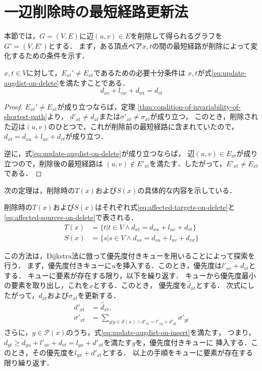\section{一辺削除時の最短経路更新法}
\label{sect:update-apsp-on-delete}
本節では，$G=(V,E)$に辺$(u,v)\in E$を削除して得られるグラフを$G'=(V,E')$とする．
まず，ある頂点ペア$x,t$の間の最短経路が削除によって変化するための条件を示す．

\begin{lemma}
  \label{lmm:update-augdist-on-delete}
  $x,t\in V$に対して，$E_{xt}'\neq E_{xt}$であるための必要十分条件は
  $x,t$が式\eqref{eq:update-augdist-on-delete}を満たすことである．
  \begin{equation}
    d_{xv}+l_{vw}+d_{wt}=d_{vt}
    \label{eq:update-augdist-on-delete}
  \end{equation}
\end{lemma}
\begin{proof}
  $E_{xt}'\neq E_{xt}$が成り立つならば，定理
  \ref{thm:condition-of-invariability-of-shortest-path}より，
  $d'_{xt}\neq d_{xt}$または$\sigma'_{xt}\neq\sigma_{xt}$が成り立つ，
  このとき，削除された辺は$(u,v)$のひとつで，これが削除前の最短経路に含まれていたので，
  $d_{xt}=d_{xu}+l_{uv}+d_{vt}$が成り立つ．

  逆に，式\eqref{eq:update-augdist-on-delete}が成り立つならば，
  辺$(u,v)\in E_{xt}$が成り立つので，削除後の最短経路は
  $(u,v)\notin E'_{xt}$を満たす．したがって，$E'_{xt}\neq E_{xt}$である．
\end{proof}

次の定理は，削除時の$T(x)$および$S(x)$の具体的な内容を示している．
\begin{theorem}
  \label{thm:affected-vertices-on-delete}
  削除時の$T(x)$および$S(x)$はそれぞれ式\eqref{eq:affected-targets-on-delete}と
  \eqref{eq:affected-sources-on-delete}で表される．
  \begin{align}
    T(x)&=\{t|t\in V\land d_{xt}=d_{xu}+l_{uv}+d_{vt}\}
    \label{eq:affected-targets-on-delete} \\
    S(x)&=\{s|s\in V\land d_{sx}=d_{su}+l_{uv}+d_{vx}\}
    \label{eq:affected-sources-on-delete}
  \end{align}
\end{theorem}

この方法は，Dijkstra法に倣って優先度付きキューを用いることによって探索を行う．
まず，優先度付きキューに$u$を挿入する．このとき，優先度は$l'_{uv}+d_{vt}$とする．
キューに要素が存在する限り，以下を繰り返す．
キューから優先度最小の要素を取り出し，これを$x$とする．このとき，
優先度を$\hat{d}_{xt}$とする．
次式にしたがって，$d_{xt}$および$\sigma_{xt}$を更新する．
\begin{equation*}
  \begin{aligned}
    d'_{xt}&=\hat{d}_{xt},\\
    \sigma'_{xt}&=\sum_{y|y\in\mathcal{S}(x)\land d'_{xt}=l'_{xy}+d'_{yt}}\sigma'_{yt}
  \end{aligned}
\end{equation*}
さらに，$y\in\mathcal{P}(x)$のうち，式\eqref{eq:update-augdist-on-insert}を満たす，
つまり，$d_{yt}\geq d_{yu}+l'_{uv}+d_{vt}=l_{yx}+d'_{xt}$を満たす$y$を，優先度付きキューに
挿入する．このとき，その優先度を$l_{yx}+d'_{xt}$とする．
以上の手順をキューに要素が存在する限り繰り返す．

